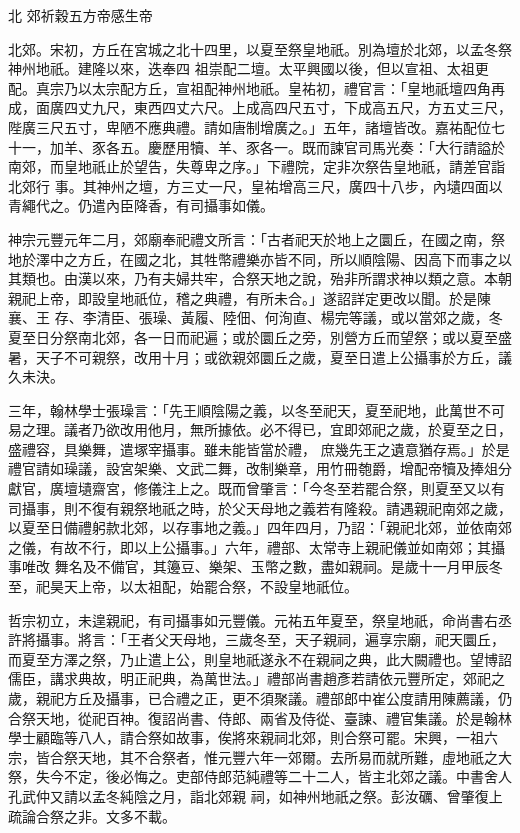 
\begin{pinyinscope}

 北
 郊祈穀五方帝感生帝



 北郊。宋初，方丘在宮城之北十四里，以夏至祭皇地祇。別為壇於北郊，以孟冬祭神州地祇。建隆以來，迭奉四
 祖崇配二壇。太平興國以後，但以宣祖、太祖更配。真宗乃以太宗配方丘，宣祖配神州地祇。皇祐初，禮官言：「皇地祇壇四角再成，面廣四丈九尺，東西四丈六尺。上成高四尺五寸，下成高五尺，方五丈三尺，陛廣三尺五寸，卑陋不應典禮。請如唐制增廣之。」五年，諸壇皆改。嘉祐配位七十一，加羊、豕各五。慶歷用犢、羊、豕各一。既而諫官司馬光奏：「大行請謚於南郊，而皇地祇止於望告，失尊卑之序。」下禮院，定非次祭告皇地祇，請差官詣北郊行
 事。其神州之壇，方三丈一尺，皇祐增高三尺，廣四十八步，內壝四面以青繩代之。仍遣內臣降香，有司攝事如儀。



 神宗元豐元年二月，郊廟奉祀禮文所言：「古者祀天於地上之圜丘，在國之南，祭地於澤中之方丘，在國之北，其牲幣禮樂亦皆不同，所以順陰陽、因高下而事之以其類也。由漢以來，乃有夫婦共牢，合祭天地之說，殆非所謂求神以類之意。本朝親祀上帝，即設皇地祇位，稽之典禮，有所未合。」遂詔詳定更改以聞。於是陳襄、王
 存、李清臣、張璪、黃履、陸佃、何洵直、楊完等議，或以當郊之歲，冬夏至日分祭南北郊，各一日而祀遍；或於圜丘之旁，別營方丘而望祭；或以夏至盛暑，天子不可親祭，改用十月；或欲親郊圜丘之歲，夏至日遣上公攝事於方丘，議久未決。



 三年，翰林學士張璪言：「先王順陰陽之義，以冬至祀天，夏至祀地，此萬世不可易之理。議者乃欲改用他月，無所據依。必不得已，宜即郊祀之歲，於夏至之日，盛禮容，具樂舞，遣塚宰攝事。雖未能皆當於禮，
 庶幾先王之遺意猶存焉。」於是禮官請如璪議，設宮架樂、文武二舞，改制樂章，用竹冊匏爵，增配帝犢及捧俎分獻官，廣壇壝齋宮，修儀注上之。既而曾肇言：「今冬至若罷合祭，則夏至又以有司攝事，則不復有親祭地祇之時，於父天母地之義若有隆殺。請遇親祀南郊之歲，以夏至日備禮躬款北郊，以存事地之義。」四年四月，乃詔：「親祀北郊，並依南郊之儀，有故不行，即以上公攝事。」六年，禮部、太常寺上親祀儀並如南郊；其攝事唯改
 舞名及不備官，其籩豆、樂架、玉幣之數，盡如親祠。是歲十一月甲辰冬至，祀昊天上帝，以太祖配，始罷合祭，不設皇地祇位。



 哲宗初立，未遑親祀，有司攝事如元豐儀。元祐五年夏至，祭皇地祇，命尚書右丞許將攝事。將言：「王者父天母地，三歲冬至，天子親祠，遍享宗廟，祀天圜丘，而夏至方澤之祭，乃止遣上公，則皇地祇遂永不在親祠之典，此大闕禮也。望博詔儒臣，講求典故，明正祀典，為萬世法。」禮部尚書趙彥若請依元豐所定，郊祀之
 歲，親祀方丘及攝事，已合禮之正，更不須聚議。禮部郎中崔公度請用陳薦議，仍合祭天地，從祀百神。復詔尚書、侍郎、兩省及侍從、臺諫、禮官集議。於是翰林學士顧臨等八人，請合祭如故事，俟將來親祠北郊，則合祭可罷。宋興，一祖六宗，皆合祭天地，其不合祭者，惟元豐六年一郊爾。去所易而就所難，虛地祇之大祭，失今不定，後必悔之。吏部侍郎范純禮等二十二人，皆主北郊之議。中書舍人孔武仲又請以孟冬純陰之月，詣北郊親
 祠，如神州地祇之祭。彭汝礪、曾肇復上疏論合祭之非。文多不載。




\end{pinyinscope}
